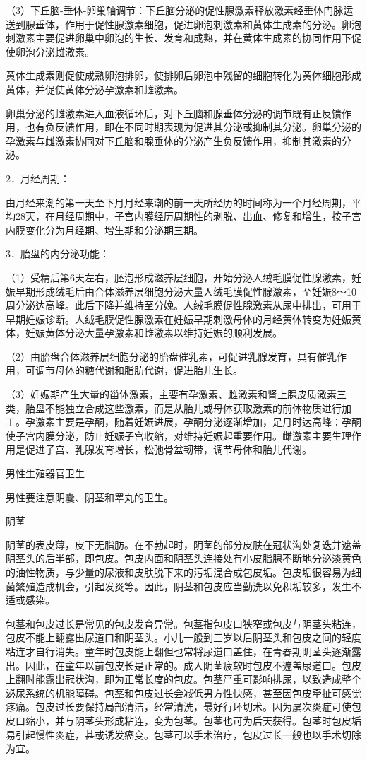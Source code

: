 \documentclass[12pt,UTF8,openany]{ctexbook}
\begin{document}
（3）下丘脑-垂体-卵巢轴调节：下丘脑分泌的促性腺激素释放激素经垂体门脉运送到腺垂体，作用于促性腺激素细胞，促进卵泡刺激素和黄体生成素的分泌。卵泡刺激素主要促进卵巢中卵泡的生长、发育和成熟，并在黄体生成素的协同作用下促使卵泡分泌雌激素。

黄体生成素则促使成熟卵泡排卵，使排卵后卵泡中残留的细胞转化为黄体细胞形成黄体，并促使黄体分泌孕激素和雌激素。

卵巢分泌的雌激素进入血液循环后，对下丘脑和腺垂体分泌的调节既有正反馈作用，也有负反馈作用，即在不同时期表现为促进其分泌或抑制其分泌。卵巢分泌的孕激素与雌激素协同对下丘脑和腺垂体的分泌产生负反馈作用，抑制其激素的分泌。

2．月经周期：

由月经来潮的第一天至下月月经来潮的前一天所经历的时间称为一个月经周期，平均28天，在月经周期中，子宫内膜经历周期性的剥脱、出血、修复和增生，按子宫内膜变化分为月经期、增生期和分泌期三期。

3．胎盘的内分泌功能：

（1）受精后第6天左右，胚泡形成滋养层细胞，开始分泌人绒毛膜促性腺激素，妊娠早期形成绒毛后由合体滋养层细胞分泌大量人绒毛膜促性腺激素，至妊娠8～10周分泌达高峰。此后下降并维持至分娩。人绒毛膜促性腺激素从尿中排出，可用于早期妊娠诊断。人绒毛膜促性腺激素在妊娠早期刺激母体的月经黄体转变为妊娠黄体，妊娠黄体分泌大量孕激素和雌激素以维持妊娠的顺利发展。

（2）由胎盘合体滋养层细胞分泌的胎盘催乳素，可促进乳腺发育，具有催乳作用，可调节母体的糖代谢和脂肪代谢，促进胎儿生长。

（3）妊娠期产生大量的甾体激素，主要有孕激素、雌激素和肾上腺皮质激素三类，胎盘不能独立合成这些激素，而是从胎儿或母体获取激素的前体物质进行加工。孕激素主要是孕酮，随着妊娠进展，孕酮分泌逐渐增加，足月时达高峰：孕酮使子宫内膜分泌，防止妊娠子宫收缩，对维持妊娠起重要作用。雌激素主要生理作用是促进子宫、乳腺发育增长，松弛骨盆韧带，调节母体和胎儿代谢。




男性生殖器官卫生


男性要注意阴囊、阴茎和睾丸的卫生。

阴茎

阴茎的表皮薄，皮下无脂肪。在不勃起时，阴茎的部分皮肤在冠状沟处复迭并遮盖阴茎头的后半部，即包皮。包皮内面和阴茎头连接处有小皮脂腺不断地分泌淡黄色的油性物质，与少量的尿液和皮肤脱下来的污垢混合成包皮垢。包皮垢很容易为细菌繁殖造成机会，引起发炎等。因此，阴茎和包皮应当勤洗以免积垢较多，发生不适或感染。

包茎和包皮过长是常见的包皮发育异常。包茎指包皮口狭窄或包皮与阴茎头粘连，包皮不能上翻露出尿道口和阴茎头。小儿一般到三岁以后阴茎头和包皮之间的轻度粘连才自行消失。童年时包皮能上翻但也常将尿道口盖住，在青春期阴茎头逐渐露出。因此，在童年以前包皮长是正常的。成人阴茎疲软时包皮不遮盖尿道口。包皮上翻时能露出冠状沟，即为正常长度的包皮。包茎严重可影响排尿，以致造成整个泌尿系统的机能障碍。包茎和包皮过长会减低男方性快感，甚至因包皮牵扯可感觉疼痛。包皮过长要保持局部清洁，经常清洗，最好行环切术。因为屡次炎症可使包皮口缩小，并与阴茎头形成粘连，变为包茎。包茎也可为后天获得。包茎时包皮垢易引起慢性炎症，甚或诱发癌变。包茎可以手术治疗，包皮过长一般也以手术切除为宜。
\end{document}
